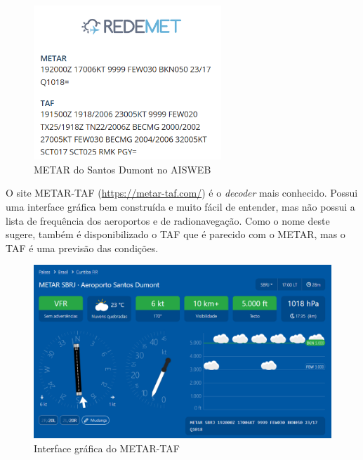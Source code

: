 \begin{figure}[ht]
    \begin{center}
    \includegraphics[width=200pt]{img/metar-aisweb.png}
    \caption{METAR do Santos Dumont no AISWEB}
    \label{fig:aisweb}
    \end{center}
\end{figure}

O site METAR-TAF (\url{https://metar-taf.com/}) é o \textit{decoder} mais conhecido. 
Possui
uma interface gráfica bem construída e muito fácil de entender, mas não possui a
lista de frequência dos aeroportos e de radionavegação. Como o nome deste sugere,
também é disponibilizado o TAF que é parecido com o METAR, mas o TAF é uma 
previsão das condições.

\begin{figure}[ht]
    \begin{center}
    \includegraphics[width=400pt]{img/ui-metar-taf.png}
    \caption{Interface gráfica do METAR-TAF}
    \label{fig:metar-taf}
    \end{center}
\end{figure}
